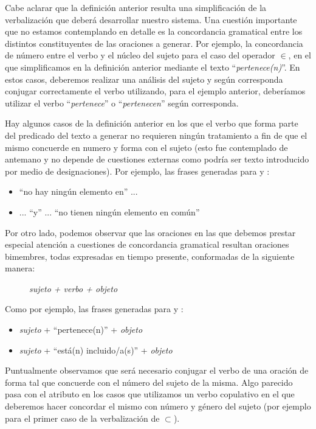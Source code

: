 Cabe aclarar que la definición anterior resulta una simplificación de la verbalización que deberá desarrollar nuestro sistema. Una cuestión importante que no estamos contemplando en detalle es la concordancia gramatical entre los distintos constituyentes de las oraciones a generar. Por ejemplo, la concordancia de número entre el verbo y el núcleo del sujeto para el caso del operador $\in$, en el que simplificamos en la definición anterior mediante el texto ``\emph{pertenece(n)}''. En estos casos, deberemos realizar una análisis del sujeto y según corresponda conjugar correctamente el verbo utilizando, para el ejemplo anterior, deberíamos utilizar el verbo ``\emph{pertenece}'' o ``\emph{pertenecen}'' según corresponda.

Hay algunos casos de la definición anterior en los que el verbo que forma parte del predicado del texto a generar no requieren ningún tratamiento a fin de que el mismo concuerde en numero y forma con el sujeto (esto fue contemplado de antemano y no depende de cuestiones externas como podría ser texto introducido por medio de designaciones). Por ejemplo, las frases generadas para  y :

\begin{itemize}
 \item ``no hay ningún elemento en'' ...
 \item ... ``y'' ... ``no tienen ningún elemento en común''
\end{itemize}

Por otro lado, podemos observar que las oraciones en las que debemos prestar especial atención a cuestiones de concordancia gramatical resultan oraciones bimembres, todas expresadas en tiempo presente, conformadas de la siguiente manera: 
\begin{figure}[H]
\center
\emph{sujeto + verbo + objeto}
\end{figure}

\noindent
Como por ejemplo, las frases generadas para  y :

\begin{itemize}
 \item \emph{sujeto} + ``pertenece(n)'' + \emph{objeto}
 \item \emph{sujeto} + ``está(n) incluido/a(s)'' + \emph{objeto}
\end{itemize}

\noindent
Puntualmente observamos que será necesario conjugar el verbo de una oración de forma tal que concuerde con el número del sujeto de la misma. Algo parecido pasa con el atributo en los casos que utilizamos un verbo copulativo en el que deberemos hacer concordar el mismo con número y género del sujeto (por ejemplo para el primer caso de la verbalización de $\subset$). 

